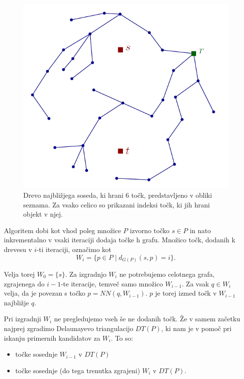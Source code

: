 \documentclass[a4paper, 12pt]{book}
\begin{document}
\begin{figure}
\centerline{\includegraphics[scale=0.6]{pics/sssptree.png}}
\caption{Drevo najbližjega soseda, ki hrani 6 točk, predstavljeno v obliki seznama. Za vsako celico so prikazani indeksi točk, ki jih hrani objekt v njej.}
\label{nnarray}
\end{figure}

Algoritem dobi kot vhod poleg množice $P$ izvorno točko $s\in P$ in nato inkrementalno v vsaki iteraciji dodaja točke h grafu. Množico točk, dodanih k drevesu v $i$-ti iteraciji, označimo kot
\[	W_i = \{ p\in P \mid d_{G(P)}(s,p) = i\}.
	\]

Velja torej $W_0 = \{s\}$. Za izgradnjo $W_i$ ne potrebujemo celotnega grafa, zgrajenega do $i-1$-te iteracije, temveč samo množico $W_{i-1}$.  Za vsak $q\in W_i$ velja, da je povezan s točko $p = NN(q, W_{i-1})$. $p$ je torej izmed točk v $W_{i-1}$ najbližje $q$.

Pri izgradnji $W_i$ ne pregledujemo vseh še ne dodanih točk. Že v samem začetku najprej zgradimo Delaunayevo triangulacijo $DT(P)$, ki nam je v pomoč pri iskanju primernih kandidatov za $W_i$. To so:

\begin{itemize}
\item točke sosednje $W_{i-1}$ v $DT(P)$
\item točke sosednje (do tega trenutka zgrajeni) $W_i$ v $DT(P)$.
\end{itemize} 
\end{document}

